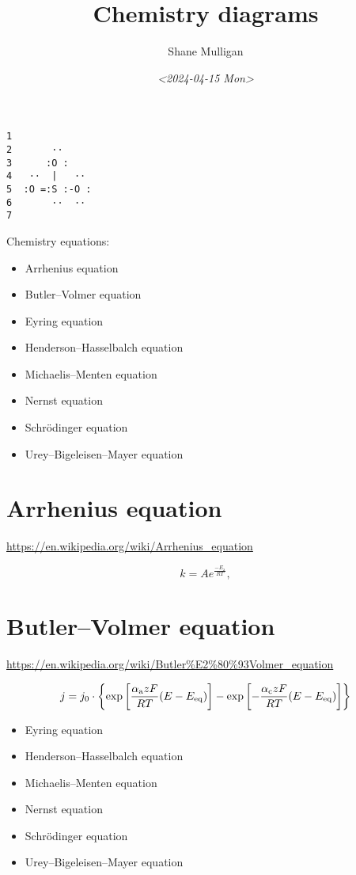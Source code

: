 \documentclass[11pt]{article}
\author{Shane Mulligan}
\date{\textit{<2024-04-15 Mon>}}
\title{Chemistry diagrams}
\begin{document}
\maketitle
\begin{verbatim}
1  
2       ··
3      :O :
4   ··  |   ··
5  :O =:S :-O :
6       ··  ··
7  
\end{verbatim}

Chemistry equations:
\begin{itemize}
\item Arrhenius equation
\item Butler–Volmer equation
\item Eyring equation
\item Henderson–Hasselbalch equation
\item Michaelis–Menten equation
\item Nernst equation
\item Schrödinger equation
\item Urey–Bigeleisen–Mayer equation
\end{itemize}

\section{Arrhenius equation}
\label{sec:orgca2303c}

\url{https://en.wikipedia.org/wiki/Arrhenius\_equation}

\begin{equation}
  {\displaystyle k=Ae^{\frac {-E_{\text{a}}}{RT}},}
\end{equation}

\section{Butler–Volmer equation}
\label{sec:org34cb50e}

\url{https://en.wikipedia.org/wiki/Butler\%E2\%80\%93Volmer\_equation}

\begin{equation}
  {\displaystyle j=j_{0}\cdot \left\{\exp \left[{\frac {\alpha _{\rm {a}}zF}{RT}}(E-E_{\rm {eq}})\right]-\exp \left[-{\frac {\alpha _{\rm {c}}zF}{RT}}(E-E_{\rm {eq}})\right]\right\}}
\end{equation}

\begin{itemize}
\item Eyring equation
\item Henderson–Hasselbalch equation
\item Michaelis–Menten equation
\item Nernst equation
\item Schrödinger equation
\item Urey–Bigeleisen–Mayer equation
\end{itemize}
\end{document}
